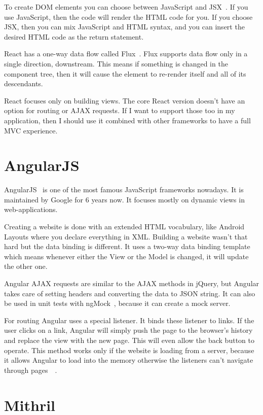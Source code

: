 To create DOM elements you can choose between JavaScript and JSX~\cite{JSX}. If you use JavaScript, then the code will render the HTML code for you. If you choose JSX, then you can mix JavaScript and HTML syntax, and you can insert the desired HTML code as the return statement. 

React has a one-way data flow called Flux~\cite{Flux}. Flux supports data flow only in a single direction, downstream. This means if something is changed in the component tree, then it will cause the element to re-render itself and all of its descendants.

React focuses only on building views. The core React version doesn't have an option for routing or AJAX requests. If I want to support those too in my application, then I should use it combined with other frameworks to have a full MVC experience.

\section{AngularJS}

AngularJS~\cite{Angular} is one of the most famous JavaScript frameworks nowadays.  It is maintained by Google for 6 years now. It focuses mostly on dynamic views in web-applications. 

Creating a website is done with an extended HTML vocabulary, like Android Layouts where you declare everything in XML. Building a website wasn't that hard but the data binding is different. It uses a two-way data binding template~\cite{Angular-Developer-DataBinding} which means whenever either the View or the Model is changed, it will update the other one.

Angular AJAX requests are similar to the AJAX methods in jQuery, but Angular takes care of setting headers and converting the data to JSON string. It can also be used in unit tests with ngMock~\cite{Angular-AJAX}, because it can create a mock server. 

For routing Angular uses a special listener. It binds these listener to links. If the user clicks on a link, Angular will simply push the page to the browser's history and replace the view with the new page. This will even allow the back button to operate. This method works only if the website is loading from a server, because it allows Angular to load into the memory otherwise the listeners can't navigate through pages~\cite{Angular-Location}~\cite{Angular-Location2}.


\section{Mithril}

